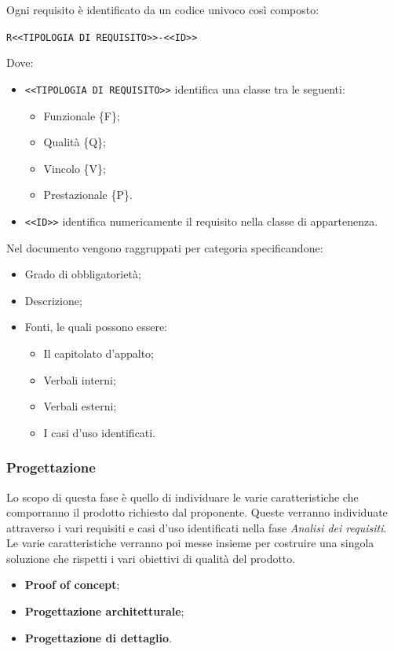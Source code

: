     Ogni requisito è identificato da un codice univoco così composto:
    \begin{center}
		\verb|R<<TIPOLOGIA DI REQUISITO>>-<<ID>>|
    \end{center}
    Dove:
    \begin{itemize}
        \item \verb|<<TIPOLOGIA DI REQUISITO>>| identifica una classe tra le seguenti:
        \begin{itemize}
            \item Funzionale \{F\};
            \item Qualità \{Q\};
            \item Vincolo \{V\};
            \item Prestazionale \{P\}.
        \end{itemize}
        \item \verb|<<ID>>| identifica numericamente il requisito nella classe di appartenenza.
    \end{itemize}
    Nel documento vengono raggruppati per categoria specificandone:
    \begin{itemize}
        \item Grado di obbligatorietà;
        \item Descrizione;
        \item Fonti, le quali possono essere:
        \begin{itemize}
        	\item Il capitolato d'appalto;
        	\item Verbali interni;
        	\item Verbali esterni;
        	\item I casi d'uso identificati.
        \end{itemize}
    \end{itemize}
	
	
	\subsubsection{Progettazione}
	Lo scopo di questa fase è quello di individuare le varie caratteristiche che comporranno il prodotto richiesto dal proponente. Queste verranno individuate attraverso i vari requisiti e casi d'uso identificati nella fase \textit{Analisi dei requisiti}. Le varie caratteristiche verranno poi messe insieme per costruire una singola soluzione che rispetti i vari obiettivi di qualità del prodotto.
	\:
	\begin{itemize}
		\item \textbf{Proof of concept};
		\item \textbf{Progettazione architetturale};
		\item \textbf{Progettazione di dettaglio}.
	\end{itemize}

